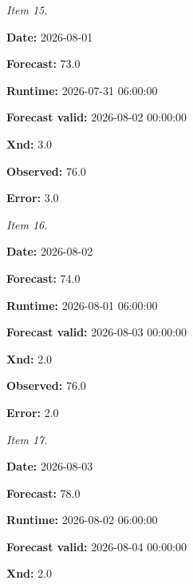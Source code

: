\documentclass[11pt]{article}
\begin{document}
\par\noindent\textit{Item 15.}\par \par\noindent\textbf{Date:} 2026-08-01

\par\noindent\textbf{Forecast:} 73.0

\par\noindent\textbf{Runtime:} 2026-07-31 06:00:00

\par\noindent\textbf{Forecast valid:} 2026-08-02 00:00:00

\par\noindent\textbf{Xnd:} 3.0

\par\noindent\textbf{Observed:} 76.0

\par\noindent\textbf{Error:} 3.0

\par\noindent\textit{Item 16.}\par \par\noindent\textbf{Date:} 2026-08-02

\par\noindent\textbf{Forecast:} 74.0

\par\noindent\textbf{Runtime:} 2026-08-01 06:00:00

\par\noindent\textbf{Forecast valid:} 2026-08-03 00:00:00

\par\noindent\textbf{Xnd:} 2.0

\par\noindent\textbf{Observed:} 76.0

\par\noindent\textbf{Error:} 2.0

\par\noindent\textit{Item 17.}\par \par\noindent\textbf{Date:} 2026-08-03

\par\noindent\textbf{Forecast:} 78.0

\par\noindent\textbf{Runtime:} 2026-08-02 06:00:00

\par\noindent\textbf{Forecast valid:} 2026-08-04 00:00:00

\par\noindent\textbf{Xnd:} 2.0
\end{document}
